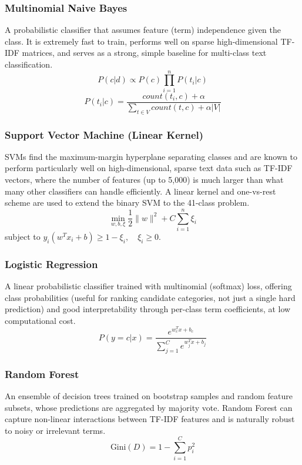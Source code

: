 \documentclass[12pt, a4paper]{report}
\begin{document}
\subsubsection{Multinomial Naive Bayes}
A probabilistic classifier that assumes feature (term) independence given the class. It is extremely fast to train, performs well on sparse high-dimensional TF-IDF matrices, and serves as a strong, simple baseline for multi-class text classification.
\begin{equation}
    P(c|d) \propto P(c) \prod_{i=1}^{n} P(t_i|c)
\end{equation}
\begin{equation}
    P(t_i|c) = \frac{count(t_i, c) + \alpha}{\sum_{t \in V} count(t, c) + \alpha |V|}
\end{equation}

\subsubsection{Support Vector Machine (Linear Kernel)}
SVMs find the maximum-margin hyperplane separating classes and are known to perform particularly well on high-dimensional, sparse text data such as TF-IDF vectors, where the number of features (up to 5,000) is much larger than what many other classifiers can handle efficiently. A linear kernel and one-vs-rest scheme are used to extend the binary SVM to the 41-class problem.
\begin{equation}
    \min_{w, b, \xi} \frac{1}{2} \|w\|^2 + C \sum_{i=1}^{n} \xi_i
\end{equation}
subject to $y_i (w^T x_i + b) \ge 1 - \xi_i, \quad \xi_i \ge 0$.

\subsubsection{Logistic Regression}
A linear probabilistic classifier trained with multinomial (softmax) loss, offering class probabilities (useful for ranking candidate categories, not just a single hard prediction) and good interpretability through per-class term coefficients, at low computational cost.
\begin{equation}
    P(y=c|x) = \frac{e^{w_c^T x + b_c}}{\sum_{j=1}^{C} e^{w_j^T x + b_j}}
\end{equation}

\subsubsection{Random Forest}
An ensemble of decision trees trained on bootstrap samples and random feature subsets, whose predictions are aggregated by majority vote. Random Forest can capture non-linear interactions between TF-IDF features and is naturally robust to noisy or irrelevant terms.
\begin{equation}
    \text{Gini}(D) = 1 - \sum_{i=1}^{C} p_i^2
\end{equation}
\end{document}
